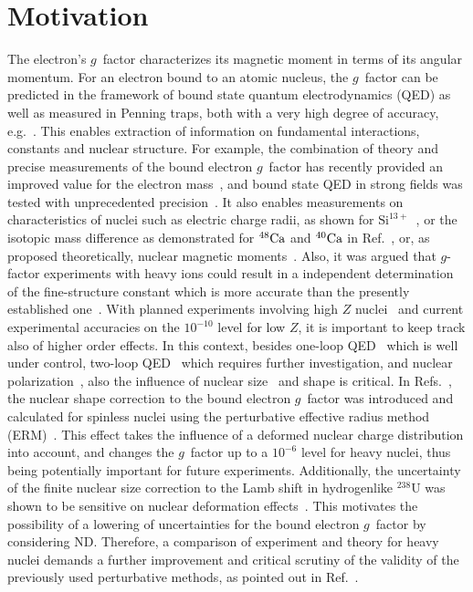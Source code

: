 \section{Motivation}
\label{sec:gfac_motiv}
The electron's $g$~factor characterizes its magnetic moment in terms of its angular momentum. For an electron bound to an atomic nucleus, the $g$~factor can be predicted in the framework of bound state quantum electrodynamics (QED) as well as measured in Penning traps, both with a very high degree of accuracy, e.g.~\cite{Sturm2014,Sturm2011}. This enables extraction of information on fundamental interactions, constants and nuclear structure. For example, the combination of theory and precise measurements of the bound electron $g$~factor has recently provided an improved value for the electron mass~\cite{Sturm2014}, and bound state QED in strong fields was tested with unprecedented precision~\cite{Haffner2000, Verdu2004, Kohler2015, Zatorski2017}. It also enables measurements on characteristics of nuclei such as electric charge radii, as shown for $\textrm{Si}^{13+}$~\cite{Sturm2011}, or the isotopic mass difference as demonstrated for $\null^{48} \textrm{Ca}$ and $\null^{40} \textrm{Ca}$ in Ref.~\cite{Kohler2016}, or, as proposed theoretically, nuclear magnetic moments~\cite{Yerokhin2011}.  Also, it was argued that $g$-factor experiments with heavy ions could result in a independent determination of the fine-structure constant which is more accurate than the presently established one~\cite{Shabaev2006,yerokhin2016}.
With planned experiments involving high $Z$ nuclei~\cite{HITRAP2008,vogel2015,sturm2017} and current experimental accuracies on the $10^{-10}$ level for low $Z$, it is important to keep track also of higher order effects. 
In this context, besides one-loop QED~\cite{Yerokhin2004,yerokhin2017} which is well under control, two-loop QED~\cite{Pachucki2005,yerokhin2013,czarnecki2016,czarnecki2018} which requires further investigation, and nuclear polarization~\cite{Nefiodov,volotka2014}, also the influence of nuclear size~\cite{karshenboim2000,Glazov2002} and shape is critical.
In Refs.~\cite{jacek2012, ZatorskiWorkingNotes}, the nuclear shape correction to the bound electron $g$~factor was introduced and calculated for spinless nuclei using the perturbative effective radius method (ERM)~\cite{Shabaev1993,kozhedub2008}. This effect takes the influence of a deformed nuclear charge distribution into account, and changes the $g$~factor up to a $10^{-6}$ level for heavy nuclei, thus being potentially important for future experiments.
Additionally, the uncertainty of the finite nuclear size correction to the Lamb shift in hydrogenlike $^{238}$U was shown to be sensitive on nuclear deformation effects~\cite{kozhedub2008}.
This motivates the possibility of a lowering of uncertainties for the bound electron $g$~factor by considering ND.
Therefore, a comparison of experiment and theory for heavy nuclei demands a further improvement and critical scrutiny of the validity of the previously used perturbative methods, as pointed out in Ref.~\cite{karshenboim2018}.

